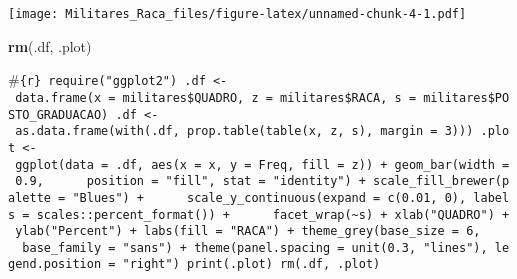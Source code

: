 \documentclass[
]{article}
\newenvironment{Shaded}{\begin{snugshade}}{\end{snugshade}}
\newcommand{\DataTypeTok}[1]{\textcolor[rgb]{0.13,0.29,0.53}{#1}}
\newcommand{\DecValTok}[1]{\textcolor[rgb]{0.00,0.00,0.81}{#1}}
\newcommand{\FloatTok}[1]{\textcolor[rgb]{0.00,0.00,0.81}{#1}}
\newcommand{\KeywordTok}[1]{\textcolor[rgb]{0.13,0.29,0.53}{\textbf{#1}}}
\newcommand{\NormalTok}[1]{#1}
\newcommand{\OperatorTok}[1]{\textcolor[rgb]{0.81,0.36,0.00}{\textbf{#1}}}
\newcommand{\StringTok}[1]{\textcolor[rgb]{0.31,0.60,0.02}{#1}}
\begin{document}
\begin{Shaded}
\end{Shaded}

\texttt{[image: Militares\_Raca\_files/figure-latex/unnamed-chunk-4-1.pdf]}

\begin{Shaded}
\begin{Highlighting}[]
\KeywordTok{rm}\NormalTok{(.df, .plot)}
\end{Highlighting}
\end{Shaded}

\#\texttt{\{r\}\ require("ggplot2")\ .df\ \textless{}-\ data.frame(x\ =\ militares\$QUADRO,\ z\ =\ militares\$RACA,\ s\ =\ militares\$POSTO\_GRADUACAO)\ .df\ \textless{}-\ as.data.frame(with(.df,\ prop.table(table(x,\ z,\ s),\ margin\ =\ 3)))\ .plot\ \textless{}-\ ggplot(data\ =\ .df,\ aes(x\ =\ x,\ y\ =\ Freq,\ fill\ =\ z))\ +\ geom\_bar(width\ =\ 0.9,\ \ \ \ \ \ position\ =\ "fill",\ stat\ =\ "identity")\ +\ scale\_fill\_brewer(palette\ =\ "Blues")\ +\ \ \ \ \ \ scale\_y\_continuous(expand\ =\ c(0.01,\ 0),\ labels\ =\ scales::percent\_format())\ +\ \ \ \ \ \ facet\_wrap(\textasciitilde{}s)\ +\ xlab("QUADRO")\ +\ ylab("Percent")\ +\ labs(fill\ =\ "RACA")\ +\ theme\_grey(base\_size\ =\ 6,\ \ \ \ \ \ base\_family\ =\ "sans")\ +\ theme(panel.spacing\ =\ unit(0.3,\ "lines"),\ legend.position\ =\ "right")\ print(.plot)\ rm(.df,\ .plot)}
\end{document}
